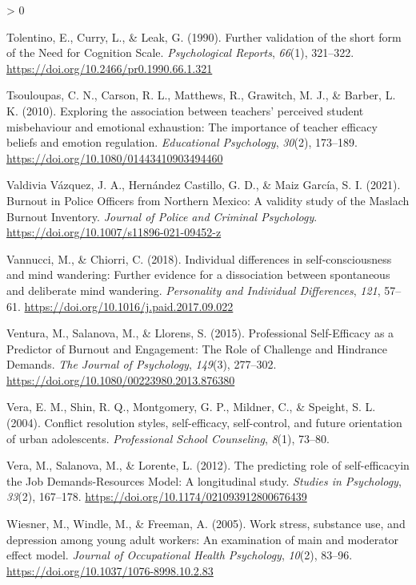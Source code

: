 \documentclass[
  english,
  man,floatsintext]{apa6}
\newlength{\cslhangindent}
\newenvironment{CSLReferences}[2] %
 {%
  \setlength{\parindent}{0pt}
  \ifodd #1 \everypar{\setlength{\hangindent}{\cslhangindent}}\ignorespaces\fi
  \ifnum #2 > 0
  \setlength{\parskip}{#2\baselineskip}
  \fi
 }%
 {}
\begin{document}
\begin{CSLReferences}{1}{0}
\leavevmode\hypertarget{ref-Tolentino1990}{}%
Tolentino, E., Curry, L., \& Leak, G. (1990). Further validation of the short form of the {Need} for {Cognition} {Scale}. \emph{Psychological Reports}, \emph{66}(1), 321--322. \url{https://doi.org/10.2466/pr0.1990.66.1.321}

\leavevmode\hypertarget{ref-Tsouloupas2010}{}%
Tsouloupas, C. N., Carson, R. L., Matthews, R., Grawitch, M. J., \& Barber, L. K. (2010). Exploring the association between teachers' perceived student misbehaviour and emotional exhaustion: The importance of teacher efficacy beliefs and emotion regulation. \emph{Educational Psychology}, \emph{30}(2), 173--189. \url{https://doi.org/10.1080/01443410903494460}

\leavevmode\hypertarget{ref-ValdiviaVazquez2021}{}%
Valdivia Vázquez, J. A., Hernández Castillo, G. D., \& Maiz García, S. I. (2021). Burnout in {Police} {Officers} from {Northern} {Mexico}: {A} validity study of the {Maslach} {Burnout} {Inventory}. \emph{Journal of Police and Criminal Psychology}. \url{https://doi.org/10.1007/s11896-021-09452-z}

\leavevmode\hypertarget{ref-Vannucci2018}{}%
Vannucci, M., \& Chiorri, C. (2018). Individual differences in self-consciousness and mind wandering: {Further} evidence for a dissociation between spontaneous and deliberate mind wandering. \emph{Personality and Individual Differences}, \emph{121}, 57--61. \url{https://doi.org/10.1016/j.paid.2017.09.022}

\leavevmode\hypertarget{ref-Ventura2015}{}%
Ventura, M., Salanova, M., \& Llorens, S. (2015). Professional {Self}-{Efficacy} as a {Predictor} of {Burnout} and {Engagement}: {The} {Role} of {Challenge} and {Hindrance} {Demands}. \emph{The Journal of Psychology}, \emph{149}(3), 277--302. \url{https://doi.org/10.1080/00223980.2013.876380}

\leavevmode\hypertarget{ref-Vera2004}{}%
Vera, E. M., Shin, R. Q., Montgomery, G. P., Mildner, C., \& Speight, S. L. (2004). Conflict resolution styles, self-efficacy, self-control, and future orientation of urban adolescents. \emph{Professional School Counseling}, \emph{8}(1), 73--80.

\leavevmode\hypertarget{ref-Vera2012}{}%
Vera, M., Salanova, M., \& Lorente, L. (2012). The predicting role of self-efficacyin the {Job} {Demands}-{Resources} {Model}: {A} longitudinal study. \emph{Studies in Psychology}, \emph{33}(2), 167--178. \url{https://doi.org/10.1174/021093912800676439}

\leavevmode\hypertarget{ref-Wiesner2005}{}%
Wiesner, M., Windle, M., \& Freeman, A. (2005). Work stress, substance use, and depression among young adult workers: An examination of main and moderator effect model. \emph{Journal of Occupational Health Psychology}, \emph{10}(2), 83--96. \url{https://doi.org/10.1037/1076-8998.10.2.83}


\end{CSLReferences}
\end{document}
